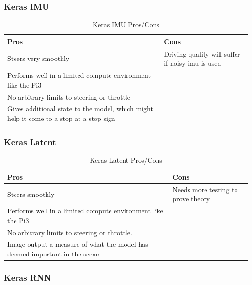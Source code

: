 \subsubsection*{Keras IMU}

\begin{table}[H]
\begin{center}
\begin{tabular}{|p{6cm}|p{6cm}|}
\hline
\textbf{Pros} & \textbf{Cons}\\
\hline
Steers very smoothly  & Driving quality will suffer if noisy imu is used \\
\hline
Performs well in a limited compute environment like the Pi3  & \\
\hline
No arbitrary limits to steering or throttle  & \\
\hline
Gives additional state to the model, which might help it come to a stop at a stop sign & \\
\hline
\end{tabular}
\end{center}
\caption{Keras IMU Pros/Cons}
\end{table}


\subsubsection*{Keras Latent}

\begin{table}[H]
\begin{center}
\begin{tabular}{|p{6cm}|p{6cm}|}
\hline
\textbf{Pros} & \textbf{Cons}\\
\hline
Steers smoothly  & Needs more testing to prove theory  \\
\hline
Performs well in a limited compute environment like the Pi3  & \\
\hline
No arbitrary limits to steering or throttle.  & \\
\hline
Image output a measure of what the model has deemed important in the scene & \\
\hline
\end{tabular}
\end{center}
\caption{Keras Latent Pros/Cons}
\end{table}

\subsubsection*{Keras RNN}

